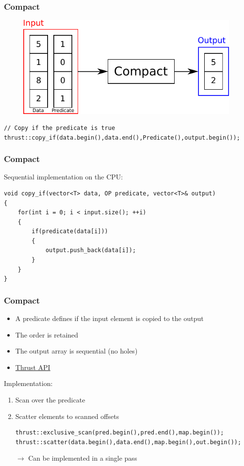 \documentclass[aspectratio=169,handout]{beamer}
\begin{document}
\begin{frame}[fragile]
\frametitle{Compact}
\begin{figure}
	\centering
	\includegraphics[height=0.6\textheight]{o_compact}
\end{figure}
\begin{lstlisting}
// Copy if the predicate is true
thrust::copy_if(data.begin(),data.end(),Predicate(),output.begin());
\end{lstlisting}
\end{frame}


\begin{frame}[fragile]
	\frametitle{Compact}
	Sequential implementation on the CPU:
\begin{lstlisting}
void copy_if(vector<T> data, OP predicate, vector<T>& output)
{
	for(int i = 0; i < input.size(); ++i)
	{
		if(predicate(data[i]))
		{
			output.push_back(data[i]);
		}
	}
}
\end{lstlisting}
\end{frame}

\begin{frame}[fragile]
\frametitle{Compact}
\begin{itemize}
	\item A predicate defines if the input element is copied to the output
	\item<2-> The order is retained
	\item<2-> The output array is sequential (no holes)
	\item<2-> \href{https://thrust.github.io/doc/group__stream__compaction.html}{Thrust API}
\end{itemize}
Implementation:
\begin{enumerate}
	\item Scan over the predicate
	\item Scatter elements to scanned offsets
\begin{lstlisting}
thrust::exclusive_scan(pred.begin(),pred.end(),map.begin());
thrust::scatter(data.begin(),data.end(),map.begin(),out.begin());
\end{lstlisting}
\item [$\rightarrow$] Can be implemented in a single pass
\end{enumerate}
\end{frame}
\end{document}
